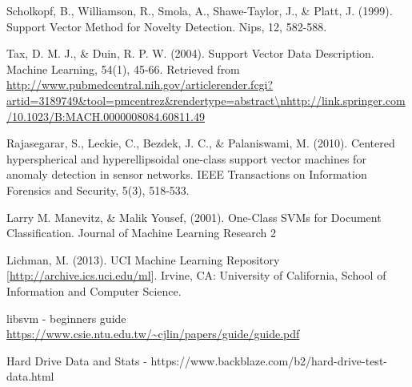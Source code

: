 \documentclass[journal]{IEEEtran}
\begin{document}
\begin{thebibliography}{1}

Scholkopf, B., Williamson, R., Smola, A., Shawe-Taylor, J., \& Platt, J. (1999). Support Vector Method for Novelty Detection. Nips, 12, 582-588.

Tax, D. M. J., \& Duin, R. P. W. (2004). Support Vector Data Description. Machine Learning, 54(1), 45-66. Retrieved from \url{http://www.pubmedcentral.nih.gov/articlerender.fcgi?artid=3189749\&tool=pmcentrez\&rendertype=abstract\nhttp://link.springer.com/10.1023/B:MACH.0000008084.60811.49}

Rajasegarar, S., Leckie, C., Bezdek, J. C., \& Palaniswami, M. (2010). Centered hyperspherical and hyperellipsoidal one-class support vector machines for anomaly detection in sensor networks. IEEE Transactions on Information Forensics and Security, 5(3), 518-533.

Larry M. Manevitz, \& Malik Yousef, (2001). One-Class SVMs for Document Classification. Journal of Machine Learning Research 2

Lichman, M. (2013). UCI Machine Learning Repository [\url{http://archive.ics.uci.edu/ml}]. Irvine, CA: University of California, School of Information and Computer Science.

libsvm - beginners guide \url{https://www.csie.ntu.edu.tw/~cjlin/papers/guide/guide.pdf}

Hard Drive Data and Stats - https://www.backblaze.com/b2/hard-drive-test-data.html
\end{thebibliography}

% 






\end{document}

